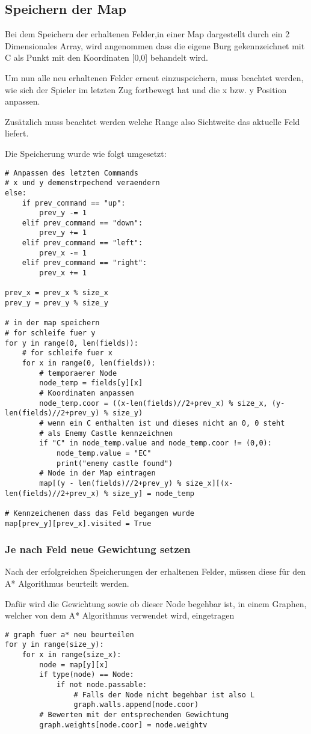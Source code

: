 \subsection{Speichern der Map}
Bei dem Speichern der erhaltenen Felder,in einer Map dargestellt durch ein 2 Dimensionales Array, wird angenommen dass die eigene Burg gekennzeichnet mit C als Punkt mit den Koordinaten [0,0] behandelt wird.

Um nun alle neu erhaltenen Felder erneut einzuspeichern, muss beachtet werden, wie sich der Spieler im letzten Zug fortbewegt hat und die x bzw. y Position anpassen.

Zusätzlich muss beachtet werden welche Range also Sichtweite das aktuelle Feld liefert.

Die Speicherung wurde wie folgt umgesetzt:
\begin{lstlisting}[style=python, caption=Map Speichern]
# Anpassen des letzten Commands
# x und y demenstrpechend veraendern
else:
	if prev_command == "up":
		prev_y -= 1
	elif prev_command == "down":
		prev_y += 1
	elif prev_command == "left":
		prev_x -= 1
	elif prev_command == "right":
		prev_x += 1

prev_x = prev_x % size_x
prev_y = prev_y % size_y

# in der map speichern
# for schleife fuer y
for y in range(0, len(fields)):
	# for schleife fuer x
	for x in range(0, len(fields)):
		# temporaerer Node
		node_temp = fields[y][x]
		# Koordinaten anpassen
		node_temp.coor = ((x-len(fields)//2+prev_x) % size_x, (y-len(fields)//2+prev_y) % size_y)
		# wenn ein C enthalten ist und dieses nicht an 0, 0 steht
		# als Enemy Castle kennzeichnen
		if "C" in node_temp.value and node_temp.coor != (0,0):
			node_temp.value = "EC"
			print("enemy castle found")
		# Node in der Map eintragen
		map[(y - len(fields)//2+prev_y) % size_x][(x-len(fields)//2+prev_x) % size_y] = node_temp

# Kennzeichenen dass das Feld begangen wurde
map[prev_y][prev_x].visited = True
\end{lstlisting}

\subsubsection{Je nach Feld neue Gewichtung setzen}
Nach der erfolgreichen Speicherungen der erhaltenen Felder, müssen diese für den A* Algorithmus beurteilt werden.

Dafür wird die Gewichtung sowie ob dieser Node begehbar ist, in einem Graphen, welcher von dem A* Algorithmus verwendet wird, eingetragen
\begin{lstlisting}[style=python, caption=Graph fuer A* beurteilen]
# graph fuer a* neu beurteilen
for y in range(size_y):
	for x in range(size_x):
		node = map[y][x]
		if type(node) == Node:
			if not node.passable:
				# Falls der Node nicht begehbar ist also L
				graph.walls.append(node.coor)
		# Bewerten mit der entsprechenden Gewichtung
		graph.weights[node.coor] = node.weightv
\end{lstlisting}


